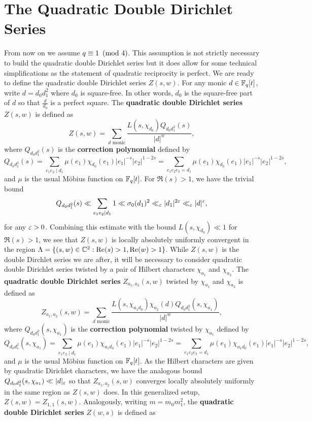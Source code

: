 \documentclass[12pt,reqno,oneside]{amsart}
\begin{document}
\section{The Quadratic Double Dirichlet Series}
    From now on we assume $q \equiv 1 \ \left(\text{mod }4\right)$. This assumption is not strictly necessary to build the quadratic double Dirichlet series but it does allow for some technical simplifications as the statement of quadratic reciprocity is perfect. We are ready to define the quadratic double Dirichlet series $Z(s,w)$. For any monic $d \in \mathbb{F}_{q}[t]$, write $d = d_{0}d_{1}^{2}$ where $d_{0}$ is square-free. In other words, $d_{0}$ is the square-free part of $d$ so that $\frac{d}{d_{0}}$ is a perfect square. The \textbf{quadratic double Dirichlet series} $Z(s,w)$ is defined as
    \[
        Z(s,w) = \sum_{\text{$d$ monic}}\frac{L(s,\chi_{d_{0}})Q_{d_{0}d_{1}^{2}}(s)}{|d|^{w}},
    \]
    where $Q_{d_{0}d_{1}^{2}}(s)$ is the \textbf{correction polynomial} defined by
    \[
        Q_{d_{0}d_{1}^{2}}(s) = \sum_{e_{1}e_{2} \mid d_{1}}\mu(e_{1})\chi_{d_{0}}(e_{1})|e_{1}|^{-s}|e_{2}|^{1-2s} = \sum_{e_{1}e_{2}e_{3} = d_{1}}\mu(e_{1})\chi_{d_{0}}(e_{1})|e_{1}|^{-s}|e_{2}|^{1-2s},
    \]
    and $\mu$ is the usual M\"obius function on $\mathbb{F}_{q}[t]$. For $\Re(s) > 1$, we have the trivial bound
    \[
        Q_{d_{0}d_{1}^{2}}(s) \ll \sum_{e_{1}e_{2} \mid d_{1}}1 \ll \sigma_{0}(d_{1})^{2} \ll_{\varepsilon} |d_{1}|^{2\varepsilon} \ll_{\varepsilon} |d|^{\varepsilon},
    \]
    for any $\varepsilon > 0$. Combining this estimate with the bound $L(s,\chi_{d_{0}}) \ll 1$ for $\Re(s) > 1$, we see that $Z(s,w)$ is locally absolutely uniformly convergent in the region $\Lambda = \{(s,w) \in \mathbb{C}^{2}:\mathrm{Re}(s) > 1, \mathrm{Re}(w) > 1\}$. While $Z(s,w)$ is the double Dirchlet series we are after, it will be necessary to consider quadratic double Dirichlet series twisted by a pair of Hilbert characters $\chi_{a_{1}}$ and $\chi_{a_{2}}$. The \textbf{quadratic double Dirichlet series} $Z_{a_{1},a_{2}}(s,w)$ twisted by $\chi_{a_{1}}$ and $\chi_{a_{2}}$ is defined as
    \[
        Z_{a_{1},a_{2}}(s,w) = \sum_{\text{$d$ monic}}\frac{L(s,\chi_{a_{1}d_{0}})\chi_{a_{2}}(d)Q_{d_{0}d_{1}^{2}}(s,\chi_{a_{1}})}{|d|^{w}},
    \]
    where $Q_{d_{0}d_{1}^{2}}(s,\chi_{a_{1}})$ is the \textbf{correction polynomial} twisted by $\chi_{a_{1}}$ defined by
    \[
        Q_{d_{0}d_{1}^{2}}(s,\chi_{a_{1}}) = \sum_{e_{1}e_{2} \mid d_{1}}\mu(e_{1})\chi_{a_{1}d_{0}}(e_{1})|e_{1}|^{-s}|e_{2}|^{1-2s} = \sum_{e_{1}e_{2}e_{3} = d_{1}}\mu(e_{1})\chi_{a_{1}d_{0}}(e_{1})|e_{1}|^{-s}|e_{2}|^{1-2s},
    \]
    and $\mu$ is the usual M\"obius function on $\mathbb{F}_{q}[t]$. As the Hilbert characters are given by quadratic Dirichlet characters, we have the analogous bound $Q_{d_{0}d_{1}^{2}}(s,\chi_{a_{1}}) \ll |d|_{\varepsilon}$ so that $Z_{a_{1},a_{2}}(s,w)$ converges locally absolutely uniformly in the same region as $Z(s,w)$ does. In this generalized setup, $Z(s,w) = Z_{1,1}(s,w)$. Analogously, writing $m = m_{0}m_{1}^{2}$, the \textbf{quadratic double Dirichlet series} $Z(w,s)$ is defined as
\end{document}
